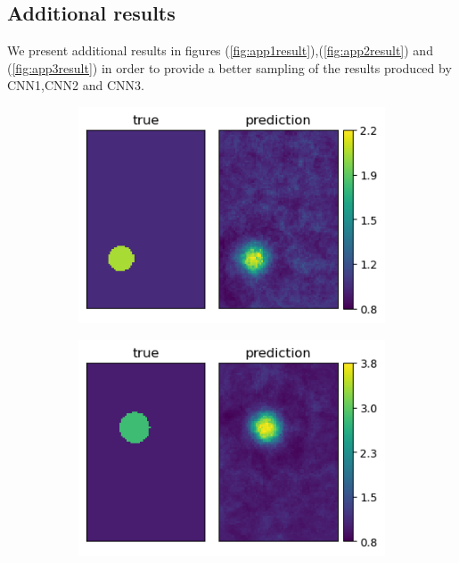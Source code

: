 \documentclass[12pt]{article}
\newcommand{\nhgappwidth}{0.23\linewidth}
\newcommand{\nhgappheight}{2.2cm}
\begin{document}
\begin{appendices}
\section{\label{sect:appendix1}Additional results}
We present additional results in figures (\ref{fig:app1result}),(\ref{fig:app2result}) and (\ref{fig:app3result}) in order to provide a better sampling of the results produced by CNN1,CNN2 and CNN3.
\begin{figure}[!h]
  \centering
  \begin{subfigure}[c]{\nhgappwidth}
    \centering    
    \includegraphics[totalheight=\nhgappheight]{Figures/Appendix/CNN1/ex1/mu.png}
  \end{subfigure}
  \begin{subfigure}[c]{\nhgappwidth}
    \centering    
    \includegraphics[totalheight=\nhgappheight]{Figures/Appendix/CNN1/ex2/mu.png}

\end{subfigure}
\end{figure}
\end{appendices}
\end{document}
